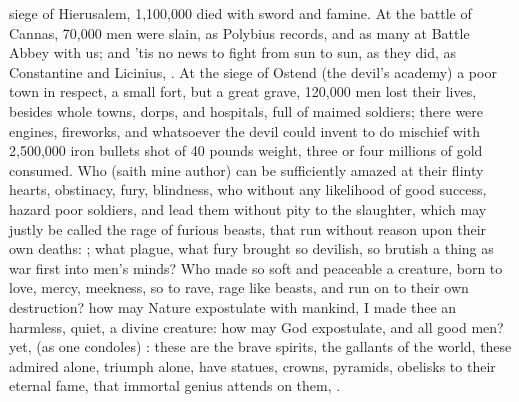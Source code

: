 {siege of Hierusalem, 1,100,000 died with sword and famine. At the
battle of Cannas, 70,000 men were slain, as Polybius records, and
as many at Battle Abbey with us; and 'tis no news to fight from sun to
sun, as they did, as Constantine and Licinius, \etc{}. At the siege of
Ostend (the devil's academy) a poor town in respect, a small fort, but
a great grave, 120,000 men lost their lives, besides whole towns,
dorps, and hospitals, full of maimed soldiers; there were engines,
fireworks, and whatsoever the devil could invent to do mischief with
2,500,000 iron bullets shot of 40 pounds weight, three or four millions
of gold consumed. Who (saith mine author) can be sufficiently
amazed at their flinty hearts, obstinacy, fury, blindness, who without
any likelihood of good success, hazard poor soldiers, and lead them
without pity to the slaughter, which may justly be called the rage of
furious beasts, that run without reason upon their own deaths:
; what plague, what
fury brought so devilish, so brutish a thing as war first into men's
minds? Who made so soft and peaceable a creature, born to love, mercy,
meekness, so to rave, rage like beasts, and run on to their own
destruction? how may Nature expostulate with mankind,  I made thee an harmless, quiet, a divine creature:
how may God expostulate, and all good men? yet,  (as
one condoles) : these
are the brave spirits, the gallants of the world, these admired alone,
triumph alone, have statues, crowns, pyramids, obelisks to their
eternal fame, that immortal genius attends on them, .

}
